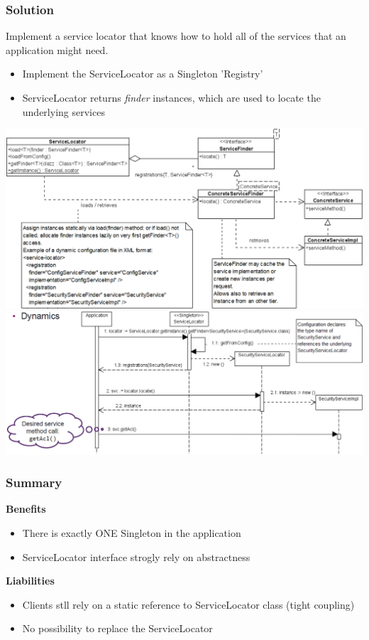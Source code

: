 \subsubsection{Solution}
Implement a service locator that knows how to hold all of the services that an application might need.
\begin{itemize}
    \item Implement the ServiceLocator as a Singleton 'Registry'
    \item ServiceLocator returns \textit{finder} instances, which are used to locate the underlying services
\end{itemize} 
\includegraphics[width=\linewidth]{./img/service_locator.png}
\includegraphics[width=\linewidth]{./img/service_locator_dynamic.png}
\subsubsection{Summary}
\textbf{Benefits}
\begin{itemize}
    \item There is exactly ONE Singleton in the application
    \item ServiceLocator interface strogly rely on abstractness
\end{itemize}
\textbf{Liabilities}
\begin{itemize}
    \item Clients stll rely on a static reference to ServiceLocator class (tight coupling)
    \item No possibility to replace the ServiceLocator 
\end{itemize}

